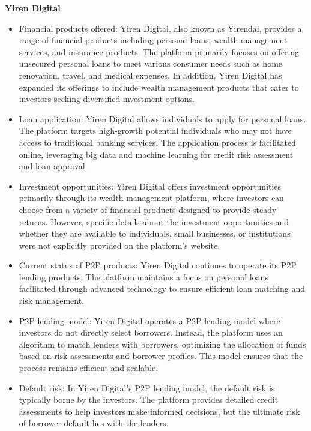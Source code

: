 \documentclass[pdflatex,sn-apa]{sn-jnl}%
\theoremstyle{thmstyleone}%
\theoremstyle{thmstyletwo}%
\theoremstyle{thmstylethree}%
\begin{document}
\vspace{1\baselineskip}
\textbf{Yiren Digital}
    \begin{itemize}
        \item Financial products offered: Yiren Digital, also known as Yirendai, provides a range of financial products including personal loans, wealth management services, and insurance products. The platform primarily focuses on offering unsecured personal loans to meet various consumer needs such as home renovation, travel, and medical expenses. In addition, Yiren Digital has expanded its offerings to include wealth management products that cater to investors seeking diversified investment options.
        
        \item Loan application: Yiren Digital allows individuals to apply for personal loans. The platform targets high-growth potential individuals who may not have access to traditional banking services. The application process is facilitated online, leveraging big data and machine learning for credit risk assessment and loan approval.
        
        \item Investment opportunities: Yiren Digital offers investment opportunities primarily through its wealth management platform, where investors can choose from a variety of financial products designed to provide steady returns. However, specific details about the investment opportunities and whether they are available to individuals, small businesses, or institutions were not explicitly provided on the platform's website.
        
        \item Current status of P2P products: Yiren Digital continues to operate its P2P lending products. The platform maintains a focus on personal loans facilitated through advanced technology to ensure efficient loan matching and risk management.
        
        \item P2P lending model: Yiren Digital operates a P2P lending model where investors do not directly select borrowers. Instead, the platform uses an algorithm to match lenders with borrowers, optimizing the allocation of funds based on risk assessments and borrower profiles. This model ensures that the process remains efficient and scalable.
        
        \item Default risk: In Yiren Digital’s P2P lending model, the default risk is typically borne by the investors. The platform provides detailed credit assessments to help investors make informed decisions, but the ultimate risk of borrower default lies with the lenders.
    \end{itemize}
\end{document}
